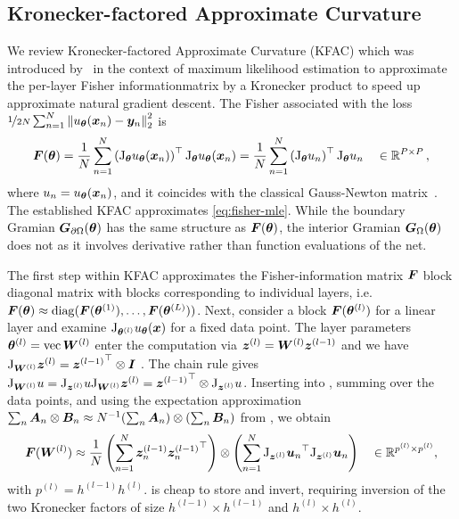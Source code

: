 \subsection{Kronecker-factored Approximate Curvature}

We review Kronecker-factored Approximate Curvature (KFAC) which was introduced by~\citet{heskes2000natural, martens2015optimizing} in the context of maximum likelihood estimation to approximate the per-layer Fisher informationmatrix by a Kronecker product to speed up approximate natural gradient descent.
The Fisher associated with the loss $\nicefrac{1}{2N} \sum_{n=1}^N \left\lVert u_{\bm{\theta}}({\bm{x}}_n) - {\bm{y}}_n \right\rVert_2^2$ is
\begin{equation}\label{eq:fisher-mle}
  {\bm{F}}({\bm{\theta}})
  =
  \frac{1}{N}
  \sum_{n=1}^N
  \left(\mathrm{J}_{{\bm{\theta}}} u_{{\bm{\theta}}}({\bm{x}}_n)  \right)^\top
  \mathrm{J}_{{\bm{\theta}}} u_{{\bm{\theta}}}({\bm{x}}_n)
  =
  \frac{1}{N}
  \sum_{n=1}^N
  \left( \mathrm{J}_{{\bm{\theta}}} u_n \right)^\top
  \mathrm{J}_{{\bm{\theta}}} u_n
  \quad\in {\mathbb{R}}^{P\times P}\,,
\end{equation}
where $u_n = u_{\bm{\theta}}({\bm{x}}_n)$, and it coincides with the classical Gauss-Newton matrix~\citep{martens2020new}.
The established KFAC approximates \eqref{eq:fisher-mle}.
While the boundary Gramian ${\bm{G}}_{\partial\Omega}({\bm{\theta}})$ has the same structure as ${\bm{F}}({\bm{\theta}})$, the interior Gramian ${\bm{G}}_\Omega({\bm{\theta}})$ does not as it involves derivative rather than function evaluations of the net.

The first step within KFAC approximates the Fisher-information matrix ${\bm{F}}$ block diagonal matrix with blocks corresponding to individual layers, i.e.\,${\bm{F}}({\bm{\theta}}) \approx \operatorname{diag}({\bm{F}}({\bm{\theta}}^{(1)}), \dots, {\bm{F}}({\bm{\theta}}^{(L)}))$. Next, consider a block ${\bm{F}}({\bm{\theta}}^{(l)})$ for a linear layer and examine $\mathrm{J}_{{\bm{\theta}}^{(l)}} u_{{\bm{\theta}}}({\bm{x}})$ for a fixed data point.
The layer parameters ${\bm{\theta}}^{(l)} = \operatorname{vec} {\bm{W}}^{(l)}$ enter the computation via ${\bm{z}}^{(l)} = {\bm{W}}^{(l)}{\bm{z}}^{(l-1)}$ and we have $\mathrm{J}_{{\bm{W}}^{(l)}} {\bm{z}}^{(l)} = {{\bm{z}}^{(l-1)}}^\top \otimes {\bm{I}}$ \citep[e.g.][]{dangel2020modular}.
The chain rule gives
$\mathrm{J}_{{\bm{W}}^{(l)}} u = \mathrm{J}_{{\bm{z}}^{(l)}}  u \mathrm{J}_{{\bm{W}}^{(l)}} {\bm{z}}^{(l)} = {{\bm{z}}^{(l-1)}}^\top\otimes  \mathrm{J}_{{\bm{z}}^{(l)}}  u$.
Inserting into , summing over the data points, and using the expectation approximation $\sum_n {\bm{A}}_n \otimes {\bm{B}}_n \approx N^{-1}(\sum_n {\bm{A}}_n) \otimes (\sum_n {\bm{B}}_n)$ from \citet{martens2015optimizing}, we obtain
\begin{equation}\label{eq:kfac-linear}
  {\bm{F}}({\bm{W}}^{(l)})
  \approx
  \frac{1}{N}
  \left(\sum_{n=1}^N {\bm{z}}^{(l-1)}_n {{\bm{z}}^{(l-1)}_n}^\top \right)\otimes \left(\sum_{n=1}^N
    {\mathrm{J}_{{\bm{z}}^{(l)}}  {\bm{u}}_n}^\top
    \mathrm{J}_{{\bm{z}}^{(l)}}  {\bm{u}}_n
  \right) \quad \in {\mathbb{R}}^{ p^{(l)} \times p^{(l)} },
\end{equation}
with $p^{(l)} = h^{(l-1)} h^{(l)}$.  is cheap to store and invert, requiring inversion of the two Kronecker factors of size $h^{(l-1)} \times h^{(l-1)}$ and $h^{(l)} \times h^{(l)}$.

